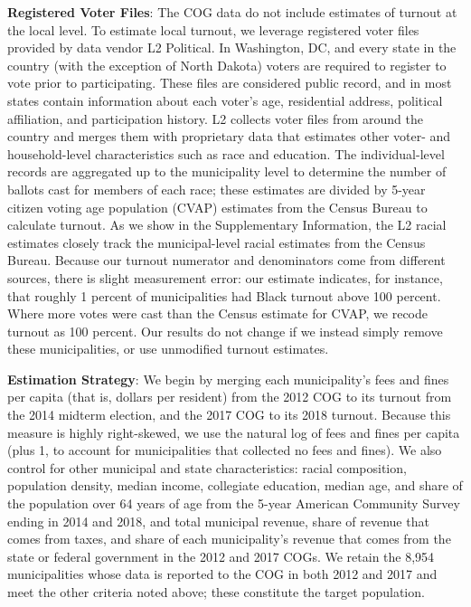 \documentclass[
  12pt,
]{article}
\begin{document}
\textbf{Registered Voter Files}: The COG data do not include estimates of turnout at the local level. To estimate local turnout, we leverage registered voter files provided by data vendor L2 Political. In Washington, DC, and every state in the country (with the exception of North Dakota) voters are required to register to vote prior to participating. These files are considered public record, and in most states contain information about each voter's age, residential address, political affiliation, and participation history. L2 collects voter files from around the country and merges them with proprietary data that estimates other voter- and household-level characteristics such as race and education. The individual-level records are aggregated up to the municipality level to determine the number of ballots cast for members of each race; these estimates are divided by 5-year citizen voting age population (CVAP) estimates from the Census Bureau to calculate turnout. As we show in the Supplementary Information, the L2 racial estimates closely track the municipal-level racial estimates from the Census Bureau. Because our turnout numerator and denominators come from different sources, there is slight measurement error: our estimate indicates, for instance, that roughly 1 percent of municipalities had Black turnout above 100 percent. Where more votes were cast than the Census estimate for CVAP, we recode turnout as 100 percent. Our results do not change if we instead simply remove these municipalities, or use unmodified turnout estimates.

\textbf{Estimation Strategy}: We begin by merging each municipality's fees and fines per capita (that is, dollars per resident) from the 2012 COG to its turnout from the 2014 midterm election, and the 2017 COG to its 2018 turnout. Because this measure is highly right-skewed, we use the natural log of fees and fines per capita (plus 1, to account for municipalities that collected no fees and fines). We also control for other municipal and state characteristics: racial composition, population density, median income, collegiate education, median age, and share of the population over 64 years of age from the 5-year American Community Survey ending in 2014 and 2018, and total municipal revenue, share of revenue that comes from taxes, and share of each municipality's revenue that comes from the state or federal government in the 2012 and 2017 COGs. We retain the 8,954 municipalities whose data is reported to the COG in both 2012 and 2017 and meet the other criteria noted above; these constitute the target population.
\end{document}
